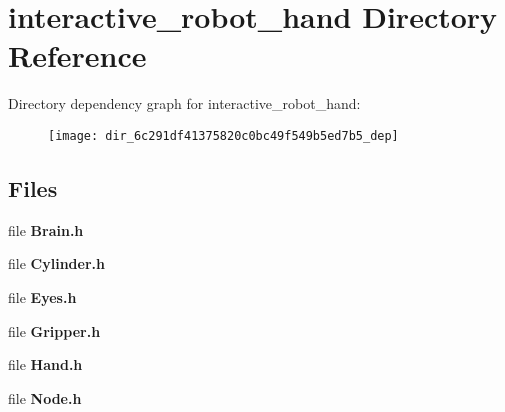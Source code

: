 \section{interactive\-\_\-robot\-\_\-hand Directory Reference}
\label{dir_6c291df41375820c0bc49f549b5ed7b5}
Directory dependency graph for interactive\-\_\-robot\-\_\-hand\-:
\nopagebreak
\begin{figure}[H]
\begin{center}
\leavevmode
\texttt{[image: dir\_6c291df41375820c0bc49f549b5ed7b5\_dep]}
\end{center}
\end{figure}
\subsection*{Files}
\begin{DoxyCompactItemize}
\item 
file {\bf Brain.\-h}
\item 
file {\bf Cylinder.\-h}
\item 
file {\bf Eyes.\-h}
\item 
file {\bf Gripper.\-h}
\item 
file {\bf Hand.\-h}
\item 
file {\bf Node.\-h}
\end{DoxyCompactItemize}
